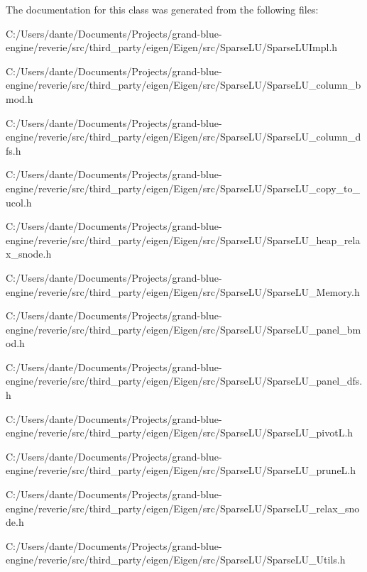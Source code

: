 The documentation for this class was generated from the following files\+:\begin{DoxyCompactItemize}
\item 
C\+:/\+Users/dante/\+Documents/\+Projects/grand-\/blue-\/engine/reverie/src/third\+\_\+party/eigen/\+Eigen/src/\+Sparse\+L\+U/Sparse\+L\+U\+Impl.\+h\item 
C\+:/\+Users/dante/\+Documents/\+Projects/grand-\/blue-\/engine/reverie/src/third\+\_\+party/eigen/\+Eigen/src/\+Sparse\+L\+U/Sparse\+L\+U\+\_\+column\+\_\+bmod.\+h\item 
C\+:/\+Users/dante/\+Documents/\+Projects/grand-\/blue-\/engine/reverie/src/third\+\_\+party/eigen/\+Eigen/src/\+Sparse\+L\+U/Sparse\+L\+U\+\_\+column\+\_\+dfs.\+h\item 
C\+:/\+Users/dante/\+Documents/\+Projects/grand-\/blue-\/engine/reverie/src/third\+\_\+party/eigen/\+Eigen/src/\+Sparse\+L\+U/Sparse\+L\+U\+\_\+copy\+\_\+to\+\_\+ucol.\+h\item 
C\+:/\+Users/dante/\+Documents/\+Projects/grand-\/blue-\/engine/reverie/src/third\+\_\+party/eigen/\+Eigen/src/\+Sparse\+L\+U/Sparse\+L\+U\+\_\+heap\+\_\+relax\+\_\+snode.\+h\item 
C\+:/\+Users/dante/\+Documents/\+Projects/grand-\/blue-\/engine/reverie/src/third\+\_\+party/eigen/\+Eigen/src/\+Sparse\+L\+U/Sparse\+L\+U\+\_\+\+Memory.\+h\item 
C\+:/\+Users/dante/\+Documents/\+Projects/grand-\/blue-\/engine/reverie/src/third\+\_\+party/eigen/\+Eigen/src/\+Sparse\+L\+U/Sparse\+L\+U\+\_\+panel\+\_\+bmod.\+h\item 
C\+:/\+Users/dante/\+Documents/\+Projects/grand-\/blue-\/engine/reverie/src/third\+\_\+party/eigen/\+Eigen/src/\+Sparse\+L\+U/Sparse\+L\+U\+\_\+panel\+\_\+dfs.\+h\item 
C\+:/\+Users/dante/\+Documents/\+Projects/grand-\/blue-\/engine/reverie/src/third\+\_\+party/eigen/\+Eigen/src/\+Sparse\+L\+U/Sparse\+L\+U\+\_\+pivot\+L.\+h\item 
C\+:/\+Users/dante/\+Documents/\+Projects/grand-\/blue-\/engine/reverie/src/third\+\_\+party/eigen/\+Eigen/src/\+Sparse\+L\+U/Sparse\+L\+U\+\_\+prune\+L.\+h\item 
C\+:/\+Users/dante/\+Documents/\+Projects/grand-\/blue-\/engine/reverie/src/third\+\_\+party/eigen/\+Eigen/src/\+Sparse\+L\+U/Sparse\+L\+U\+\_\+relax\+\_\+snode.\+h\item 
C\+:/\+Users/dante/\+Documents/\+Projects/grand-\/blue-\/engine/reverie/src/third\+\_\+party/eigen/\+Eigen/src/\+Sparse\+L\+U/Sparse\+L\+U\+\_\+\+Utils.\+h\end{DoxyCompactItemize}
